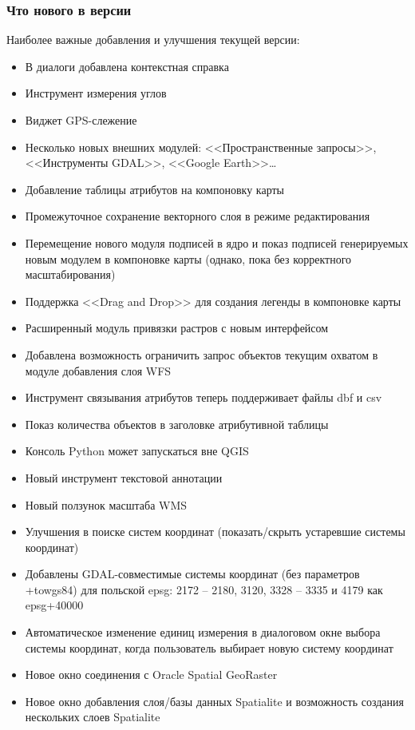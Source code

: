 \subsubsection{Что нового в версии \CURRENT}

Наиболее важные добавления и улучшения текущей версии:
\begin{itemize}[label=--]
 \item В диалоги добавлена контекстная справка
 \item Инструмент измерения углов
 \item Виджет GPS-слежение
 \item Несколько новых внешних модулей: <<Пространственные запросы>>,
 <<Инструменты GDAL>>, <<Google Earth>>\dots
 \item Добавление таблицы атрибутов на компоновку карты
 \item Промежуточное сохранение векторного слоя в режиме редактирования
 \item Перемещение нового модуля подписей в ядро и показ подписей
 генерируемых новым модулем в компоновке карты (однако, пока без корректного
 масштабирования)
 \item Поддержка <<Drag and Drop>> для создания легенды в
 компоновке карты
 \item Расширенный модуль привязки растров с новым интерфейсом
 \item Добавлена возможность ограничить запрос объектов текущим охватом
 в модуле добавления слоя WFS
 \item Инструмент связывания атрибутов теперь поддерживает файлы dbf
 и csv
 \item Показ количества объектов в заголовке атрибутивной таблицы
 \item Консоль Python может запускаться вне QGIS
 \item Новый инструмент текстовой аннотации
 \item Новый ползунок масштаба WMS
 \item Улучшения в поиске систем координат (показать/скрыть устаревшие
 системы координат)
 \item Добавлены GDAL-совместимые системы координат (без параметров
 +towgs84) для польской epsg: 2172 -- 2180, 3120, 3328 -- 3335 и 4179 как
 epsg+40000
 \item Автоматическое изменение единиц измерения в диалоговом окне
 выбора системы координат, когда пользователь выбирает новую систему
 координат
 \item Новое окно соединения с Oracle Spatial GeoRaster
 \item Новое окно добавления слоя/базы данных Spatialite и возможность
 создания нескольких слоев Spatialite

\end{itemize}
